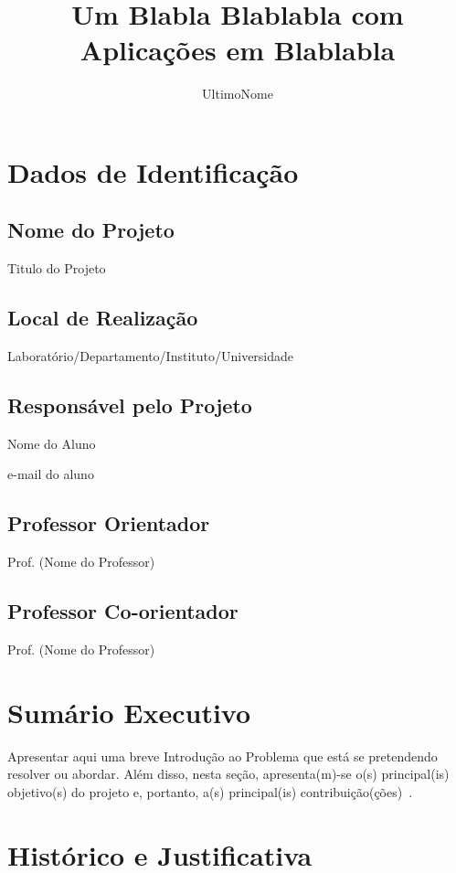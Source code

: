\documentclass[tcc-proposta]{texsenac}
\title{Um Blabla Blablabla com Aplicações em Blablabla}
\author{UltimoNome}{Nome Sobrenome de}
\begin{document}

\maketitle 
\sloppy

\chapter{Dados de Identificação}

\section{Nome do Projeto}
Titulo do Projeto

\section{Local de Realização}
Laboratório/Departamento/Instituto/Universidade

\section{Responsável pelo Projeto}
Nome do Aluno

e-mail do aluno

\section{Professor Orientador}
Prof. (Nome do Professor)

\section{Professor Co-orientador}
Prof. (Nome do Professor)

\chapter{Sumário Executivo}

Apresentar aqui uma breve Introdução ao Problema que está se
pretendendo resolver ou abordar. Além disso, nesta seção,
apresenta(m)-se o(s) principal(is) objetivo(s) do projeto e, portanto,
a(s) principal(is) contribuição(ções)~\citet{Moore:1979:MAI,Aguiar:2005}.

\chapter{Histórico e Justificativa}
\end{document}
